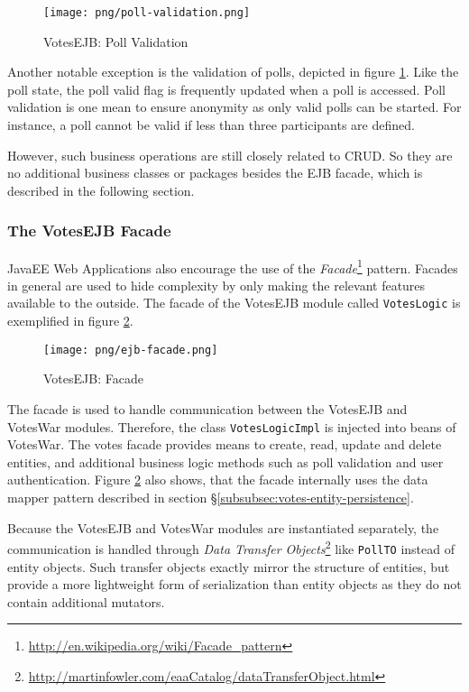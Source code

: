 \begin{figure}[h]
\centering
\texttt{[image: png/poll-validation.png]}
\caption{VotesEJB: Poll Validation}
\label{figure:poll-validation}
\end{figure}

Another notable exception is the validation of polls, depicted in figure \ref{figure:poll-validation}.
Like the poll state, the poll valid flag is frequently updated when a poll is accessed.
Poll validation is one mean to ensure anonymity as only valid polls can be started.
For instance, a poll cannot be valid if less than three participants are defined.

However, such business operations are still closely related to CRUD.
So they are no additional business classes or packages besides the EJB facade, which is described in the following section.

\subsubsection{The VotesEJB Facade}
\label{subsubsec:the-votesejb-facade}
JavaEE Web Applications also encourage the use of the \textit{Facade}\footnote{\url{http://en.wikipedia.org/wiki/Facade_pattern}} pattern.
Facades in general are used to hide complexity by only making the relevant features available to the outside.
The facade of the VotesEJB module called \texttt{VotesLogic} is exemplified in figure \ref{figure:ejb-facade}.

\begin{figure}[h]
\centering
\texttt{[image: png/ejb-facade.png]}
\caption{VotesEJB: Facade}
\label{figure:ejb-facade}
\end{figure}

The facade is used to handle communication between the VotesEJB and VotesWar modules.
Therefore, the class \texttt{VotesLogicImpl} is injected into beans of VotesWar.
The votes facade provides means to create, read, update and delete entities, and additional business logic methods such as poll validation and user authentication.
Figure \ref{figure:ejb-facade} also shows, that the facade internally uses the data mapper pattern described in section §\ref{subsubsec:votes-entity-persistence}.

Because the VotesEJB and VotesWar modules are instantiated separately, the communication is handled through \textit{Data Transfer Objects}\footnote{\url{http://martinfowler.com/eaaCatalog/dataTransferObject.html}} like \texttt{PollTO} instead of entity objects.
Such transfer objects exactly mirror the structure of entities, but provide a more lightweight form of serialization than entity objects as they do not contain additional mutators.



